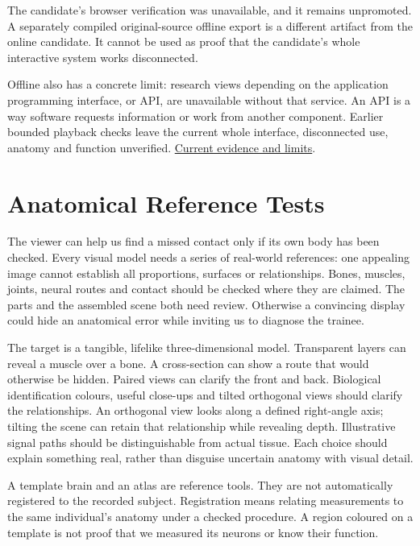 The candidate's browser verification was unavailable, and it remains unpromoted. A separately compiled original-source offline export is a different artifact from the online candidate. It cannot be used as proof that the candidate's whole interactive system works disconnected.\par

Offline also has a concrete limit: research views depending on the application programming interface, or API, are unavailable without that service. An API is a way software requests information or work from another component. Earlier bounded playback checks leave the current whole interface, disconnected
use, anatomy and function unverified. \href{research-evidence.json}{Current evidence and limits}.\par

\section{Anatomical Reference Tests}

The viewer can help us find a missed contact only if its own body has been checked. Every visual model needs a series of real-world references: one appealing image cannot establish all proportions, surfaces or relationships. Bones, muscles, joints, neural routes and contact should be checked where they are claimed. The parts and the assembled scene both need review. Otherwise a convincing display could hide an anatomical error while inviting us to diagnose the trainee.\par

The target is a tangible, lifelike three-dimensional model. Transparent layers can reveal a muscle over a bone. A cross-section can show a route that would otherwise be hidden. Paired views can clarify the front and back. Biological identification colours, useful close-ups and tilted orthogonal views should clarify the relationships. An orthogonal view looks along a defined right-angle axis; tilting the scene can retain that relationship while revealing depth. Illustrative signal paths should be distinguishable from actual tissue. Each choice should explain something real, rather than disguise uncertain anatomy with visual detail.\par

A template brain and an atlas are reference tools. They are not automatically registered to the recorded subject. Registration means relating measurements to the same individual's anatomy under a checked procedure. A region coloured on a template is not proof that we measured its neurons or know their function.\par

